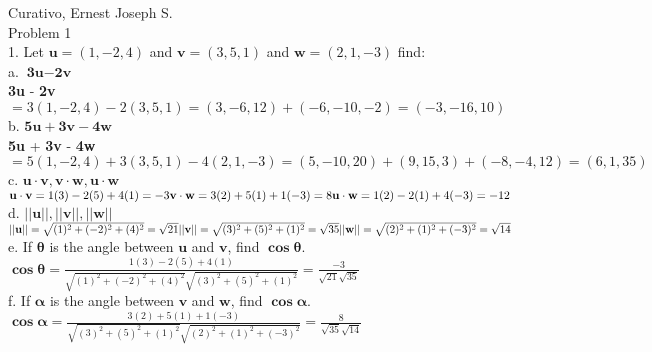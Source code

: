 \documentclass[11pt]{article}
\begin{document}
Curativo, Ernest Joseph S. \\[5pt]
Problem 1 \\[5pt]

1. Let $\textbf{u} = (1,-2,4)$ and $\textbf{v}=(3,5,1)$ and $\textbf{w}=(2,1,-3)$ find: \\[5pt]

a. $\textbf{3u} - \textbf{2v}$ \\[5pt]

$
$\textbf{3u} - \textbf{2v}$
= 3(1,-2,4) - 2(3,5,1)
= (3,-6,12) + (-6,-10,-2)
= (-3,-16,10)
$ \\[5pt]

b. $\textbf{5u} + \textbf{3v} - \textbf{4w}$ \\[5pt]

$
$\textbf{5u} + \textbf{3v} - \textbf{4w}$
= 5(1,-2,4) + 3(3,5,1) - 4(2,1,-3)
= (5,-10,20) + (9,15,3) + (-8,-4,12)
= (6,1,35)
$ \\[5pt]

c. $\textbf{u}\cdot\textbf{v}, \textbf{v}\cdot\textbf{w}, \textbf{u}\cdot\textbf{w}$ \\ [5pt]

$
\textbf{u}\cdot\textbf{v} =
1(3)-2(5)+4(1) = -3\\
\textbf{v}\cdot\textbf{w} = 3(2)+5(1)+1(-3) = 8\\
\textbf{u}\cdot\textbf{w} = 1(2)-2(1)+4(-3) = -12
$ \\[5pt]

d. $||\textbf{u}||,||\textbf{v}||,||\textbf{w}||$ \\[5pt]

$
||\textbf{u}|| =
\sqrt{(1)^2+(-2)^2+(4)^2} = \sqrt{21} \\
||\textbf{v}|| = 
\sqrt{(3)^2+(5)^2+(1)^2}= \sqrt{35} \\
||\textbf{w}|| = 
\sqrt{(2)^2+(1)^2+(-3)^2} = \sqrt{14}
$ \\[5pt]

e. If $\mathbf{\theta}$ is the angle between $\mathbf{u}$ and $\mathbf{v}$, find $\mathbf{\cos \theta}$. \\[5pt]

$
\mathbf{\cos \theta}
= \frac{1(3)-2(5)+4(1)}{\sqrt{(1)^2+(-2)^2+(4)^2}\sqrt{(3)^2+(5)^2+(1)^2}}
= \frac{-3}{\sqrt{21} \sqrt{35}}
$ \\[5pt]

f. If $\mathbf{\alpha}$ is the angle between $\mathbf{v}$ and $\mathbf{w}$, find $\mathbf{\cos \alpha}$. \\[5pt]

$
\mathbf{\cos \alpha}
= \frac{3(2)+5(1)+1(-3)}{\sqrt{(3)^2+(5)^2+(1)^2}\sqrt{(2)^2+(1)^2+(-3)^2}}
= \frac{8}{\sqrt{35} \sqrt{14}}
$ \\[5pt]
\end{document}
